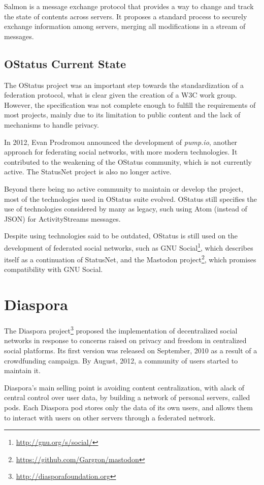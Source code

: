 Salmon is a message exchange protocol that provides a way to change and
track the state of contents across servers. It proposes a standard
process to securely exchange information among servers, merging
all modifications in a stream of messages.

\subsection{OStatus Current State}

The OStatus project was an important step towards the standardization of
a federation protocol, what is clear given the creation of a W3C work
group.  However, the specification was not complete enough to fulfill
the requirements of most projects, mainly due to its limitation to
public content and the lack of mechanisms to handle privacy.

In 2012, Evan Prodromou announced the development of \textit{pump.io},
another approach for federating social networks, with more modern
technologies. It contributed to the weakening of the OStatus community,
which is not currently active. The StatusNet project is also no longer
active.

Beyond there being no active community to maintain or develop the
project, most of the technologies used in OStatus suite evolved. OStatus
still specifies the use of technologies considered by many as legacy,
such using Atom (instead of JSON) for ActivityStreams messages.

Despite using technologies said to be outdated, OStatus is still used on the
development of federated social networks, such as GNU
Social\footnote{\url{http://gnu.org/s/social/}}, which describes itself
as a continuation of StatusNet, and the Mastodon
project\footnote{\url{https://github.com/Gargron/mastodon}}, which promises
compatibility with GNU Social.

\section{Diaspora}

The Diaspora project\footnote{\url{http://diasporafoundation.org}} proposed the
implementation of decentralized social networks in response to concerns raised
on privacy and freedom in centralized social platforms. Its first version was
released on September, 2010 as a result of a crowdfunding campaign. By August,
2012, a community of users started to maintain it.

Diaspora's main selling point is avoiding content centralization, with alack of
central control over user data, by building a network of personal servers,
called pods. Each Diaspora pod stores only the data of its own users, and
allows them to interact with users on other servers through a federated
network.

